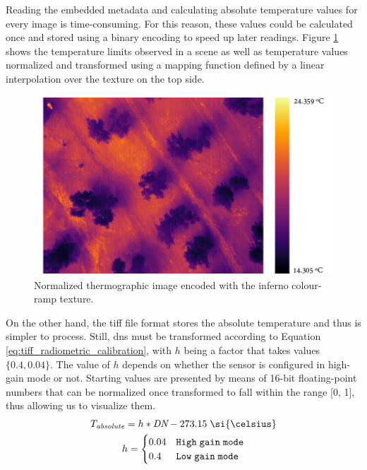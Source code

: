 \vspace{3mm}



Reading the embedded metadata and calculating absolute temperature values for every image is time-consuming. For this reason, these values could be calculated once and stored using a binary encoding to speed up later readings. Figure \ref{fig:thermal_inferno_temperature} shows the temperature limits observed in a scene as well as temperature values normalized and transformed using a mapping function defined by a linear interpolation over the texture on the top side.

\begin{figure}[ht]
	\centering
	\includegraphics[width=0.85\linewidth]{figs/materials/thermal_inferno_temperature.png}
	\caption{Normalized thermographic image encoded with the inferno colour-ramp texture. }
	\label{fig:thermal_inferno_temperature}
\end{figure}

On the other hand, the \acrshort{tiff} file format stores the absolute temperature and thus is simpler to process. Still, \acrshort{dn}s must be transformed according to Equation \ref{eq:tiff_radiometric_calibration}, with $h$ being a factor that takes values $\{0.4, 0.04\}$. The value of $h$ depends on whether the sensor is configured in high-gain mode or not. Starting values are presented by means of 16-bit floating-point numbers that can be normalized once transformed to fall within the range [0, 1], thus allowing us to visualize them.
\begin{gather}
    \label{eq:tiff_radiometric_calibration}
    \begin{aligned}
        T_{\textit{absolute}} &= h * \textit{DN} - 273.15 \hspace{1mm} \si{\celsius}\\
    \end{aligned}\\
    h=\begin{cases}
        0.04 &\mathtt{High \hspace{1mm} gain \hspace{1mm} mode}\\
        0.4 &\mathtt{Low \hspace{1mm} gain \hspace{1mm} mode}\\
    \end{cases}
\end{gather}

